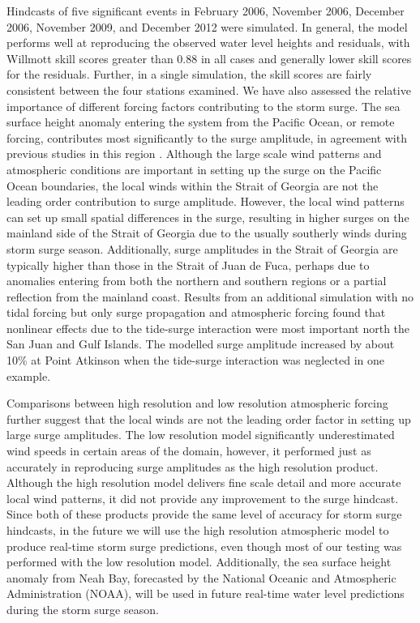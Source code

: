 \documentclass{tATO2e}
\begin{document}
Hindcasts of five significant events in February 2006, November 2006, December 2006, November 2009, and December 2012 were simulated. In general, the model performs well at reproducing the observed water level heights and residuals, with Willmott skill scores greater than 0.88 in all cases and generally lower skill scores for the residuals.  Further, in a single simulation, the skill scores are fairly consistent between the four stations examined. We have also assessed the relative importance of different forcing factors contributing to the storm surge. The sea surface height anomaly entering the system from the Pacific Ocean, or remote forcing,  contributes most significantly to the surge amplitude, in agreement with previous studies in this region \citep{murty1995storm}. Although the large scale wind patterns and atmospheric conditions are important in setting up the surge on the Pacific Ocean boundaries, the local winds within the Strait of Georgia are not the leading order contribution to surge amplitude. However, the local wind patterns can set up small spatial differences in the surge, resulting in higher surges on the mainland side of the Strait of Georgia due to the usually southerly winds during storm surge season. Additionally, surge amplitudes in the Strait of Georgia are typically higher than those in the Strait of Juan de Fuca, perhaps due to anomalies entering from both the northern and southern regions or a partial reflection from the mainland coast. Results from an additional simulation with no tidal forcing but only surge propagation and atmospheric forcing found that nonlinear effects due to the tide-surge interaction were most important north the San Juan and Gulf Islands. The modelled surge amplitude increased by about 10\% at Point Atkinson when the tide-surge interaction was neglected in one example. 

Comparisons between high resolution and low resolution atmospheric forcing further suggest that the local winds are not the leading order factor in setting up large surge amplitudes. The low resolution model significantly underestimated wind speeds in certain areas of the domain, however, it performed just as accurately in reproducing surge amplitudes as the high resolution product.  Although the high resolution model delivers fine scale detail and more accurate local wind patterns, it did not provide any improvement to the surge hindcast. Since both of these products provide the same level of accuracy for storm surge hindcasts, in the future we will use the high resolution atmospheric model to produce real-time storm surge predictions, even though most of our testing was performed with the low resolution model. Additionally, the sea surface height anomaly from Neah Bay, forecasted by the National Oceanic and Atmospheric Administration (NOAA), will be used in future real-time water level predictions during the storm surge season. 
\end{document}
